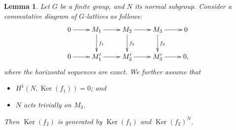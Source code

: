 \documentclass[10pt,a4paper]{amsart}
\newtheorem{lem}{Lemma}
\DeclareMathOperator{\Ker}{Ker}
\begin{document}
\begin{lem}\label{lem:fgdc}
Let $G$ be a finite group, and $N$ its normal subgroup. Consider a commutative diagram of $G$-lattices as follows: 
\begin{equation*}
\xymatrix{
0\ar[r]& M_{1}\ar[r]\ar[d]^{f_{1}}& M_{2}\ar[r]\ar[d]^{f_{2}}& M_{3}\ar[r]\ar[d]^{f_{3}}&0\\
0\ar[r]& M'_{1}\ar[r]& M'_{2}\ar[r]& M'_{3}\ar[r]&0,  
}
\end{equation*}
where the horizontal sequences are exact. We further assume that 
\begin{itemize}
\item[(a)] $H^{1}(N,\Ker(f_{1}))=0$; and 
\item[(b)] $N$ acts trivially on $M_{3}$.  
\end{itemize}
Then $\Ker(f_{2})$ is generated by $\Ker(f_{1})$ and $\Ker(f_{2})^{N}$. 
\end{lem}
\end{document}
